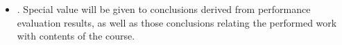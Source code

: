 \begin{itemize}
\item {}.
      Special value will be given to conclusions derived from performance evaluation
      results, as well as those conclusions relating the performed work with
      contents of the course.

\end{itemize}

